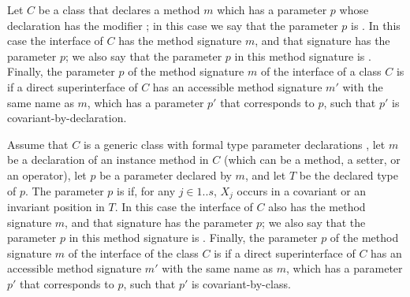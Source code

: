 \documentclass[makeidx]{article}
\begin{document}


\LMHash{}%
Let $C$ be a class that declares a method $m$ which has
a parameter $p$ whose declaration has the modifier \COVARIANT{};
in this case we say that the parameter $p$ is
.
%
In this case the interface of $C$ has the method signature $m$,
and that signature has the parameter $p$;
we also say that the parameter $p$ in this method signature is
.
%
Finally, the parameter $p$ of the method signature $m$
of the interface of a class $C$ is
if a direct superinterface of $C$
has an accessible method signature $m'$ with the same name as $m$,
which has a parameter $p'$ that corresponds to $p$,
such that $p'$ is covariant-by-declaration.

\LMHash{}%
Assume that $C$ is a generic class with formal type parameter declarations
,
let $m$ be a declaration of an instance method in $C$
(which can be a method, a setter, or an operator),
let $p$ be a parameter declared by $m$, and
let $T$ be the declared type of $p$.
%
The parameter $p$ is
if, for any $j \in 1 .. s$,
$X_j$ occurs in a covariant or an invariant position in $T$.
%
In this case the interface of $C$ also has the method signature $m$,
and that signature has the parameter $p$;
we also say that the parameter $p$ in this method signature is
.
Finally, the parameter $p$ of the method signature $m$
of the interface of the class $C$ is
if a direct superinterface of $C$
has an accessible method signature $m'$ with the same name as $m$,
which has a parameter $p'$ that corresponds to $p$,
such that $p'$ is covariant-by-class.
\end{document}
